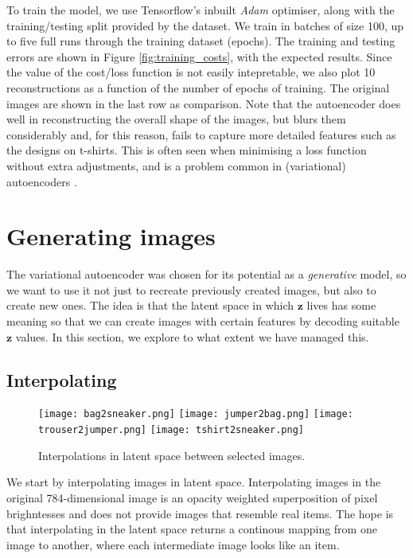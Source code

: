 \documentclass[]{article}
\begin{document}
To train the model, we use Tensorflow's inbuilt \textit{Adam} optimiser, along with the training/testing split provided by the dataset. We train in batches of size 100, up to five full runs through the training dataset (epochs). The training and testing errors are shown in Figure \ref{fig:training_costs}, with the expected results. Since the value of the cost/loss function is not easily intepretable, we also plot 10 reconstructions as a function of the number of epochs of training. The original images are shown in the last row as comparison. Note that the autoencoder does well in reconstructing the overall shape of the images, but blurs them considerably and, for this reason, fails to capture more detailed features such as the designs on t-shirts. This is often seen when minimising a loss function without extra adjustments, and is a problem common in (variational) autoencoders \cite{lamb, frans}. 




\section{Generating images}
\label{sec:generating}

The variational autoencoder was chosen for its potential as a \textit{generative} model, so we want to use it not just to recreate previously created images, but also to create new ones. The idea is that the latent space in which $\bm{z}$ lives has some meaning so that we can create images with certain features by decoding suitable $\bm{z}$ values. In this section, we explore to what extent we have managed this.


\subsection{Interpolating}
\label{sec:generating:interpolating}

\begin{figure}
  \centering
  \texttt{[image: bag2sneaker.png]}
  \texttt{[image: jumper2bag.png]}
  \texttt{[image: trouser2jumper.png]}
  \texttt{[image: tshirt2sneaker.png]}
  \caption{Interpolations in latent space between selected images.}
  \label{fig:interpolations}
\end{figure}

We start by interpolating images in latent space. Interpolating images in the original 784-dimensional image is an opacity weighted superposition of pixel brighntesses and does not provide images that resemble real items. The hope is that interpolating in the latent space returns a continous mapping from one image to another, where each intermediate image looks like an item.
\end{document}

